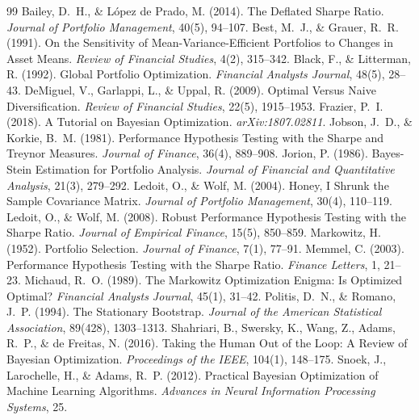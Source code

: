 \documentclass[a4paper,12pt]{article}
\begin{document}
\begin{thebibliography}{99}
 Bailey, D.\ H., \& L\'opez de Prado, M. (2014). The Deflated Sharpe Ratio. \textit{Journal of Portfolio Management}, 40(5), 94--107.
 Best, M.\ J., \& Grauer, R.\ R. (1991). On the Sensitivity of Mean-Variance-Efficient Portfolios to Changes in Asset Means. \textit{Review of Financial Studies}, 4(2), 315--342.
 Black, F., \& Litterman, R. (1992). Global Portfolio Optimization. \textit{Financial Analysts Journal}, 48(5), 28--43.
 DeMiguel, V., Garlappi, L., \& Uppal, R. (2009). Optimal Versus Naive Diversification. \textit{Review of Financial Studies}, 22(5), 1915--1953.
 Frazier, P.\ I. (2018). A Tutorial on Bayesian Optimization. \textit{arXiv:1807.02811}.
 Jobson, J.\ D., \& Korkie, B.\ M. (1981). Performance Hypothesis Testing with the Sharpe and Treynor Measures. \textit{Journal of Finance}, 36(4), 889--908.
 Jorion, P. (1986). Bayes-Stein Estimation for Portfolio Analysis. \textit{Journal of Financial and Quantitative Analysis}, 21(3), 279--292.
 Ledoit, O., \& Wolf, M. (2004). Honey, I Shrunk the Sample Covariance Matrix. \textit{Journal of Portfolio Management}, 30(4), 110--119.
 Ledoit, O., \& Wolf, M. (2008). Robust Performance Hypothesis Testing with the Sharpe Ratio. \textit{Journal of Empirical Finance}, 15(5), 850--859.
 Markowitz, H. (1952). Portfolio Selection. \textit{Journal of Finance}, 7(1), 77--91.
 Memmel, C. (2003). Performance Hypothesis Testing with the Sharpe Ratio. \textit{Finance Letters}, 1, 21--23.
 Michaud, R.\ O. (1989). The Markowitz Optimization Enigma: Is Optimized Optimal? \textit{Financial Analysts Journal}, 45(1), 31--42.
 Politis, D.\ N., \& Romano, J.\ P. (1994). The Stationary Bootstrap. \textit{Journal of the American Statistical Association}, 89(428), 1303--1313.
 Shahriari, B., Swersky, K., Wang, Z., Adams, R.\ P., \& de Freitas, N. (2016). Taking the Human Out of the Loop: A Review of Bayesian Optimization. \textit{Proceedings of the IEEE}, 104(1), 148--175.
 Snoek, J., Larochelle, H., \& Adams, R.\ P. (2012). Practical Bayesian Optimization of Machine Learning Algorithms. \textit{Advances in Neural Information Processing Systems}, 25.
\end{thebibliography}
\end{document}
